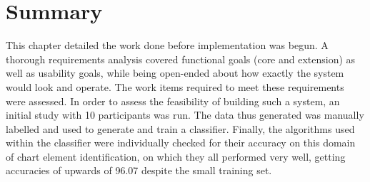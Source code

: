 	

\section{Summary}
This chapter detailed the work done before implementation was begun. A thorough requirements analysis covered functional goals (core and extension) as well as usability goals, while being open-ended about how exactly the system would look and operate. The work items required to meet these requirements were assessed. In order to assess the feasibility of building such a system, an initial study with 10 participants was run. The data thus generated was manually labelled and used to generate and train a classifier. Finally, the algorithms used within the classifier were individually checked for their accuracy on this domain of chart element identification, on which they all performed very well, getting accuracies of upwards of 96.07 despite the small training set.